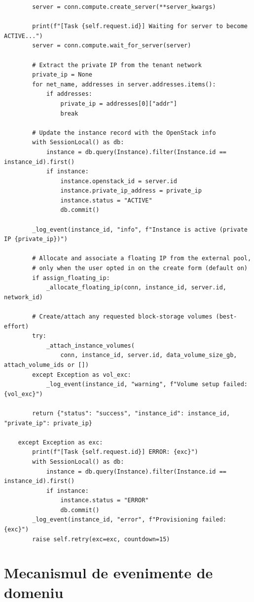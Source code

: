 \begin{lstlisting}
        server = conn.compute.create_server(**server_kwargs)

        print(f"[Task {self.request.id}] Waiting for server to become ACTIVE...")
        server = conn.compute.wait_for_server(server)

        # Extract the private IP from the tenant network
        private_ip = None
        for net_name, addresses in server.addresses.items():
            if addresses:
                private_ip = addresses[0]["addr"]
                break

        # Update the instance record with the OpenStack info
        with SessionLocal() as db:
            instance = db.query(Instance).filter(Instance.id == instance_id).first()
            if instance:
                instance.openstack_id = server.id
                instance.private_ip_address = private_ip
                instance.status = "ACTIVE"
                db.commit()

        _log_event(instance_id, "info", f"Instance is active (private IP {private_ip})")

        # Allocate and associate a floating IP from the external pool,
        # only when the user opted in on the create form (default on)
        if assign_floating_ip:
            _allocate_floating_ip(conn, instance_id, server.id, network_id)

        # Create/attach any requested block-storage volumes (best-effort)
        try:
            _attach_instance_volumes(
                conn, instance_id, server.id, data_volume_size_gb, attach_volume_ids or [])
        except Exception as vol_exc:
            _log_event(instance_id, "warning", f"Volume setup failed: {vol_exc}")

        return {"status": "success", "instance_id": instance_id, "private_ip": private_ip}

    except Exception as exc:
        print(f"[Task {self.request.id}] ERROR: {exc}")
        with SessionLocal() as db:
            instance = db.query(Instance).filter(Instance.id == instance_id).first()
            if instance:
                instance.status = "ERROR"
                db.commit()
        _log_event(instance_id, "error", f"Provisioning failed: {exc}")
        raise self.retry(exc=exc, countdown=15)
\end{lstlisting}

\newpage
\section{Mecanismul de evenimente de domeniu}
\label{anexa:evenimente}

